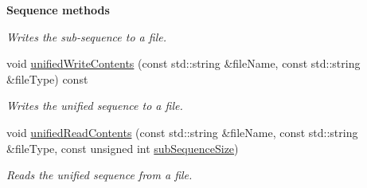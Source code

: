 \begin{Indent}{\bf Sequence methods}
\begin{DoxyCompactItemize}
\begin{DoxyCompactList}\small\item\em Writes the sub-\/sequence to a file. \end{DoxyCompactList}\item 
void \hyperlink{class_q_u_e_s_o_1_1_scalar_sequence_a2f832dd5eda37df06eb52650ab8ce733}{unified\-Write\-Contents} (const std\-::string \&file\-Name, const std\-::string \&file\-Type) const 
\begin{DoxyCompactList}\small\item\em Writes the unified sequence to a file. \end{DoxyCompactList}\item 
void \hyperlink{class_q_u_e_s_o_1_1_scalar_sequence_a6aaf13eda57e55b709d247cfd1ab22bc}{unified\-Read\-Contents} (const std\-::string \&file\-Name, const std\-::string \&file\-Type, const unsigned int \hyperlink{class_q_u_e_s_o_1_1_scalar_sequence_a0288ea295eedc216a1617b3286f6f3a0}{sub\-Sequence\-Size})
\begin{DoxyCompactList}\small\item\em Reads the unified sequence from a file. \end{DoxyCompactList}\end{DoxyCompactItemize}
\end{Indent}
